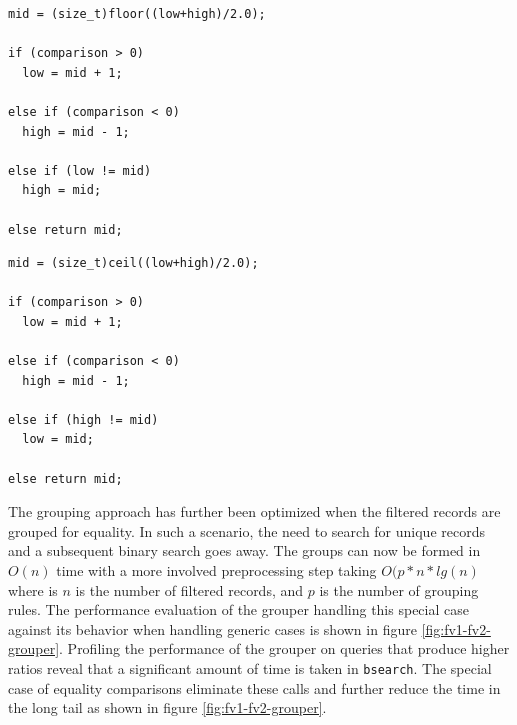 \begin{center}
\begin{minipage}{.44\textwidth}
	\begin{lstlisting}
mid = (size_t)floor((low+high)/2.0);

if (comparison > 0)
  low = mid + 1;

else if (comparison < 0)
  high = mid - 1;

else if (low != mid)
  high = mid;

else return mid;
	\end{lstlisting}
\end{minipage}
\hfill
\begin{minipage}{.44\textwidth}
	\begin{lstlisting}
mid = (size_t)ceil((low+high)/2.0);

if (comparison > 0)
  low = mid + 1;

else if (comparison < 0)
  high = mid - 1;

else if (high != mid)
  low = mid;

else return mid;
	\end{lstlisting}
\end{minipage}
\end{center}

The grouping approach has further been optimized when the filtered records are
grouped for equality. In such a scenario, the need to search for unique
records and a  subsequent binary search goes away.  The groups can now be
formed in $O(n)$ time with a more involved preprocessing step taking
$O(p*n*lg(n)$ where is $n$ is the number of  filtered records, and $p$ is the number of grouping rules. The
performance evaluation of the grouper handling this special case against its
behavior when handling generic cases is shown in figure
\ref{fig:fv1-fv2-grouper}. Profiling the performance of the grouper on queries
that produce higher ratios reveal that a significant amount of time is taken
in \texttt{bsearch}. The special case of equality comparisons eliminate these
calls and further reduce the time in the long tail as shown in figure
\ref{fig:fv1-fv2-grouper}.

